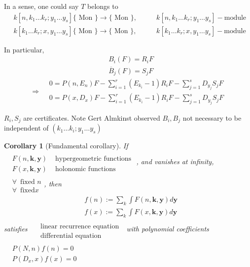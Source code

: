 \documentclass[10pt]{amsart}
\newtheorem{corollary}{Corollary}
\begin{document}
\begin{multicols*}{2}
In a sense, one could say $T$ belongs to 
\[
\begin{aligned}
  & k[n,k_1 \dots k_r;y_1 \dots y_s] \lbrace \text{ Mon } \rbrace \to \lbrace \text{ Mon } \rbrace, \qquad & k[n,k_1 \dots k_r; y_1 \dots y_s]-\text{module } \\ 
  & k[k_1 \dots k_r;x,y_1 \dots y_s] \lbrace \text{ Mon } \rbrace \to \lbrace \text{ Mon } \rbrace, \qquad & k[k_1 \dots k_r; x,y_1 \dots y_s]-\text{module } 
\end{aligned}
\]

In particular, \[
\begin{aligned}
  & B_i(F) = R_iF \\ 
  & \overline{B}_j(F) = S_jF
\end{aligned}
\]
\[
\Longrightarrow \begin{aligned}
  & 0 = P(n,E_n)F - \sum_{i=1}^r (E_{k_i}-1)R_iF - \sum_{j=1}^s D_{y_j}S_jF \\ 
  & 0 = P(x,D_x)F - \sum_{i=1}^r(E_{k_i}-1)R_iF - \sum_{j=1}^s D_{y_j}S_jF
\end{aligned}
\]

$R_i,S_j$ are certificates.  Note Gert Almkinst observed $B_i,B_j$ not necessary to be independent of $(k_1 \dots k_i; y_1 \dots y_s)$



\begin{corollary}[Fundamental corollary]
If $\begin{aligned} & \quad \\
  & F(n,\mathbf{k}, \mathbf{y}) & \text{ hypergeometric functions } \\ 
  & F(x,\mathbf{k}, \mathbf{y}) & \text{ holonomic functions }
\end{aligned}$, and vanishes at infinity, $\begin{aligned} & \quad \\
  & \forall \, \text{ fixed } n \\ 
  & \forall \, \text{ fixed} x \end{aligned}$, then
\[
\begin{aligned}
  & f(n):=\sum_k \int F(n,\mathbf{k},\mathbf{y}) d\mathbf{y} \\ 
  & f(x):=\sum_k \int F(x,\mathbf{k},\mathbf{y}) d\mathbf{y}
\end{aligned}
\]
satisfies $\begin{aligned} & \quad \\ 
  & \text{ linear recurrence equation } \\ 
  & \text{ differential equation } \end{aligned}$ with polynomial coefficients $\begin{aligned} & \quad \\
  & P(N,n)f(n) =0  \\
  & P(D_x,x)f(x) = 0\end{aligned}$
\end{corollary}


\end{multicols*}
\end{document}
